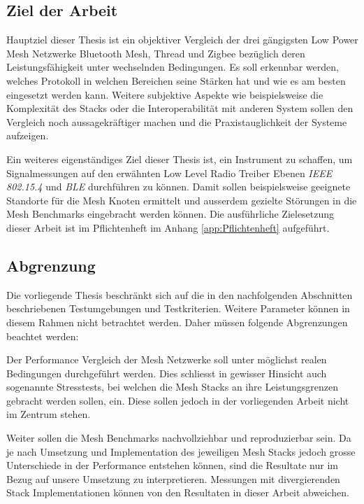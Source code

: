 \subsection{Ziel der Arbeit}\label{subsec:ZielderArbeit}
Hauptziel dieser Thesis ist ein objektiver Vergleich der drei gängigsten Low Power Mesh Netzwerke Bluetooth Mesh, Thread und Zigbee bezüglich deren Leistungsfähigkeit unter wechselnden Bedingungen.
Es soll erkennbar werden, welches Protokoll in welchen Bereichen seine Stärken hat und wie es am besten eingesetzt werden kann.
Weitere subjektive Aspekte wie beispielsweise die Komplexität des Stacks oder die Interoperabilität mit anderen System sollen den Vergleich noch aussagekräftiger machen und die Praxistauglichkeit der Systeme aufzeigen.

Ein weiteres eigenständiges Ziel dieser Thesis ist, ein Instrument zu schaffen, um Signalmessungen auf den erwähnten Low Level Radio Treiber Ebenen \textit{IEEE 802.15.4} und \textit{BLE} durchführen zu können. Damit sollen beispielsweise geeignete Standorte für die Mesh Knoten ermittelt und ausserdem gezielte Störungen in die Mesh Benchmarks eingebracht werden können.
Die ausführliche Zielesetzung dieser Arbeit ist im Pflichtenheft im Anhang \ref{app:Pflichtenheft} aufgeführt.

\subsection{Abgrenzung}\label{sec:Abgrenzung}
Die vorliegende Thesis beschränkt sich auf die in den nachfolgenden Abschnitten beschriebenen Testumgebungen und Testkriterien. Weitere Parameter können in diesem Rahmen nicht betrachtet werden.
Daher müssen folgende Abgrenzungen beachtet werden:

Der Performance Vergleich der Mesh Netzwerke soll unter möglichst realen Bedingungen durchgeführt werden. Dies schliesst in gewisser Hinsicht auch sogenannte Stresstests, bei welchen die Mesh Stacks an ihre Leistungsgrenzen gebracht werden sollen, ein. Diese sollen jedoch in der vorliegenden Arbeit nicht im Zentrum stehen.

Weiter sollen die Mesh Benchmarks nachvollziehbar und reproduzierbar sein. Da je nach Umsetzung und Implementation des jeweiligen Mesh Stacks jedoch grosse Unterschiede in der Performance entstehen können, sind die Resultate nur im Bezug auf unsere Umsetzung zu interpretieren. Messungen mit divergierenden Stack Implementationen können von den Resultaten in dieser Arbeit abweichen.

